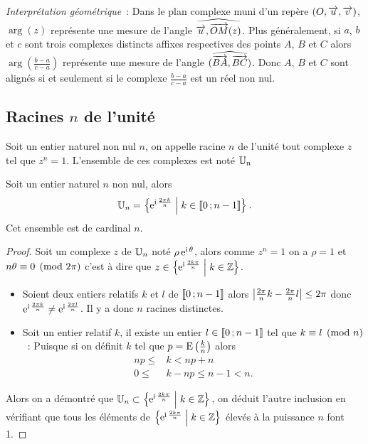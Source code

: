 \emph{Interprétation géométrique}~: Dans le plan complexe muni d'un repère $(O,\overrightarrow{u}, \overrightarrow{v})$, $\arg(z)$ représente une mesure de l'angle $\widehat{\overrightarrow{u}, \overrightarrow{OM}(z)}$. Plus généralement, si $a$, $b$ et $c$ sont trois complexes distincts affixes respectives des points $A$, $B$ et $C$ alors $\arg\left(\frac{b-a}{c-a}\right)$ représente une mesure de l'angle $(\widehat{\overrightarrow{BA},\overrightarrow{BC}})$. Donc $A$, $B$ et $C$ sont alignés si et seulement si le complexe $\frac{b-a}{c-a}$ est un réel non nul.
%
\subsection{Racines $n$\iemes{} de l'unité}
\label{subsec:racineunite}
\begin{defdef}
  Soit un entier naturel non nul $n$, on appelle racine $n$\iemes{} de l'unité tout complexe $z$ tel que $z^n=1$. L'ensemble de ces complexes est noté $\mathbb{U}_n$
\end{defdef}
\begin{prop}
  Soit un entier naturel $n$ non nul, alors
  \begin{equation}
    \mathbb{U}_n=\left\{\operatorname{e}^{\operatorname{i} \frac{2 \pi k}{n}}\mathrel{}\middle|\mathrel{}k\in\mathopen{\llbracket}0\mathclose{}\mathpunct{};n-1\mathclose{\rrbracket}\right\}.
  \end{equation}
  Cet ensemble est de cardinal $n$.
\end{prop}
\begin{proof}
  Soit un complexe $z$ de $\mathbb{U}_n$ noté $\rho \operatorname{e}^{\operatorname{i} \theta}$, alors comme $z^n=1$ on a $\rho=1$ et $n\theta \equiv 0 \pmod {2\pi}$ c'est à dire que $z \in \left\{\operatorname{e}^{\operatorname{i} \frac{2k\pi}{n}}\mathrel{}\middle|\mathrel{}k \in \mathbb{Z}\right\}$.
  \begin{itemize}
  \item Soient deux entiers relatifs $k$ et $l$ de $\mathopen{\llbracket}0\mathclose{}\mathpunct{};n-1\mathclose{\rrbracket}$ alors $\left\lvert\frac{2\pi}{n}k - \frac{2\pi}{n}l\right\rvert \leq 2\pi$ donc $\operatorname{e}^{\operatorname{i} \frac{2\pi k}{n}} \neq \operatorname{e}^{\operatorname{i} \frac{2\pi l}{n}}$. Il y a donc $n$ racines distinctes.
  \item Soit un entier relatif $k$, il existe un entier $l \in \mathopen{\llbracket}0\mathclose{}\mathpunct{};n-1\mathclose{\rrbracket}$ tel que $k \equiv l \pmod {n}$~:
      Puisque si on définit $k$ tel que $p=\operatorname{E}\left( \frac{k}{n} \right)$ alors
      \begin{align}
        np \leq & k < np +n \\
        0 \leq & k-np \leq n-1 <n.
      \end{align}
    \end{itemize}
    Alors on a démontré que $\mathbb{U}_n \subset \left\{\operatorname{e}^{\operatorname{i} \frac{2k\pi}{n}}\mathrel{}\middle|\mathrel{}k \in \mathbb{Z}\right\}$, on déduit l'autre inclusion en vérifiant que tous les éléments de $\left\{\operatorname{e}^{\operatorname{i} \frac{2k\pi}{n}}\mathrel{}\middle|\mathrel{}k \in \mathbb{Z}\right\}$ élevés à la puissance $n$ font 1.
\end{proof}

